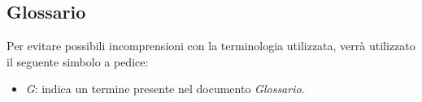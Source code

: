 \subsection{Glossario}
    Per evitare possibili incomprensioni con la terminologia utilizzata, verrà utilizzato il seguente simbolo a pedice:
    \begin{itemize}
        \item \textit{G}: indica un termine presente nel documento \textit{Glossario}.  
    \end{itemize}
 